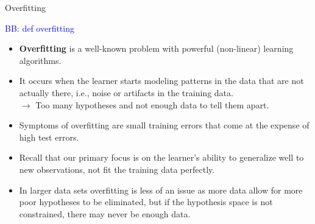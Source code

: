 \begin{vbframe}{Overfitting}
\framebreak

\textcolor{blue}{BB: def overfitting}

\framebreak

\begin{itemize}
  \item \textbf{Overfitting} is a well-known problem with powerful 
  (non-linear) learning algorithms.
  \item It occurs when the learner starts modeling patterns in the data 
  that are not actually there, i.e., noise or artifacts in the training data. \\
  $\rightarrow$ Too many hypotheses and not enough data to tell them apart.
  \item Symptoms of overfitting are small training errors that come at the 
  expense of high test errors.
  \item Recall that our primary focus is on the learner's ability to generalize 
  well to new observations, not fit the training data perfectly.
  \item In larger data sets overfitting is less of an issue as more data allow 
  for more poor hypotheses to be eliminated, but if the hypothesis space is not 
  constrained, there may never be enough data.
\end{itemize}

\end{vbframe}


% 
% 


